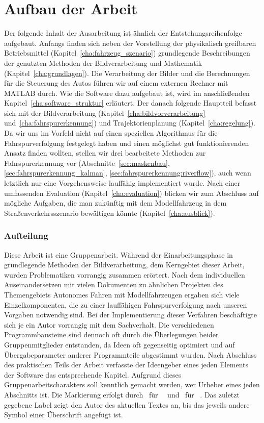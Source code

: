 \section{Aufbau der Arbeit \dcfirstauthorshort}

Der folgende Inhalt der Ausarbeitung ist ähnlich der Entstehungsreihenfolge aufgebaut. Anfangs finden sich neben der Vorstellung der physikalisch greifbaren Betriebsmittel (Kapitel~\ref{cha:fahrzeug_szenario}) grundlegende Beschreibungen der genutzten Methoden der Bildverarbeitung und Mathematik (Kapitel~\ref{cha:grundlagen}). Die Verarbeitung der Bilder und die Berechnungen für die Steuerung des Autos führen wir auf einem externen Rechner mit MATLAB durch. Wie die Software dazu aufgebaut ist, wird im anschließenden Kapitel~\ref{cha:software_struktur} erläutert. Der danach folgende Hauptteil befasst sich mit der Bildverarbeitung (Kapitel~\ref{cha:bildvorverarbeitung} und~\ref{cha:fahrspurerkennung}) und Trajektorienplanung (Kapitel~\ref{cha:regelung}). Da wir uns im Vorfeld nicht auf einen speziellen Algorithmus für die Fahrspurverfolgung festgelegt haben und einen möglichst gut funktionierenden Ansatz finden wollten, stellen wir drei bearbeitete Methoden zur Fahrspurerkennung vor (Abschnitte~\ref{sec:maskenbau}, \ref{sec:fahrspurerkennung_kalman}, \ref{sec:fahrspurerkennung:riverflow}), auch wenn letztlich nur eine Vorgehensweise lauffähig implementiert wurde. Nach einer umfassenden Evaluation (Kapitel~\ref{cha:evaluation}) blicken wir zum Abschluss auf mögliche Aufgaben, die man zukünftig mit dem Modellfahrzeug in dem Straßenverkehrsszenario bewältigen könnte (Kapitel~\ref{cha:ausblick}).

\subsubsection{Aufteilung \dcsecondauthorshort}

Diese Arbeit ist eine Gruppenarbeit.
Während der Einarbeitungsphase in grundlegende Methoden der Bildverarbeitung, dem Kerngebiet dieser Arbeit, wurden Problematiken vorrangig zusammen erörtert. Nach dem individuellen Auseinandersetzen mit vielen Dokumenten zu ähnlichen Projekten des Themengebiets \glqq Autonomes Fahren mit Modellfahrzeugen\grqq{} ergaben sich viele Einzelkomponenten, die zu einer lauffähigen Fahrspurverfolgung nach unseren Vorgaben notwendig sind. Bei der Implementierung dieser Verfahren beschäftigte sich je ein Autor vorrangig mit dem Sachverhalt. Die verschiedenen Programmbausteine sind dennoch oft durch die Überlegungen beider Gruppenmitglieder entstanden, da Ideen oft gegenseitig optimiert und auf Übergabeparameter anderer Programmteile abgestimmt wurden. Nach Abschluss des praktischen Teils der Arbeit verfasste der Ideengeber eines jeden Elements der Software das entsprechende Kapitel.   
Aufgrund dieses Gruppenarbeitscharakters soll kenntlich gemacht werden, wer Urheber eines jeden Abschnitts ist. Die Markierung erfolgt durch \dcfirstauthorshort\ für \dcfirstauthorfirstname\ \dcfirstauthorlastname\  und \dcsecondauthorshort\  für \dcsecondauthorfirstname\ \dcsecondauthorlastname{}. Das zuletzt gegebene Label zeigt den Autor des aktuellen Textes an, bis das jeweils andere Symbol einer Überschrift angefügt ist.


